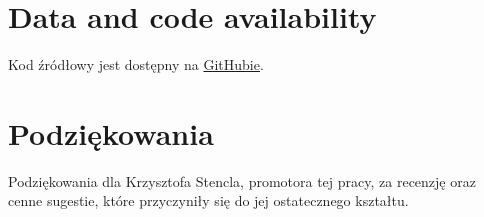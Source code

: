 \documentclass[]{einformatica}
\begin{document}
\maketitle 








\section*{Data and code availability}
Kod źródłowy jest dostępny na \href{https://github.com/Sobczakus1658/Who-adopts-Coding-Agents-on-GitHub}{GitHubie}.

\section*{Podziękowania}
Podziękowania dla Krzysztofa Stencla, promotora tej pracy, za recenzję oraz cenne sugestie, które przyczyniły się do jej ostatecznego kształtu.

 

\end{document}
